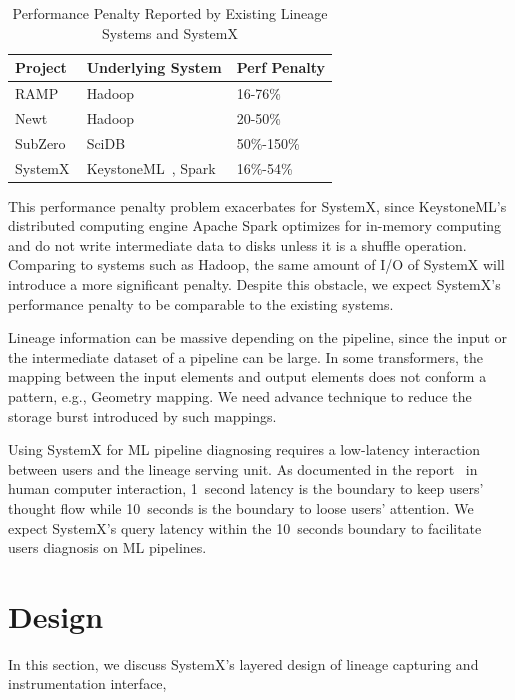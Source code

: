 \documentclass{sig-alternate}
\begin{document}
\begin{table}[ht]
\begin{center}
    \caption{Performance Penalty Reported by Existing Lineage Systems and SystemX}
    \begin{scriptsize}
    \begin{tabular}{ | p{1.5cm} | p{3.5cm} | p{2cm} |}
    \hline
    Project & Underlying System & Perf Penalty  \\ \hline \hline
    RAMP~\cite{ikeda11} & Hadoop~\cite{HADOOP} & 16-76\% \\ \hline
    Newt~\cite{logothetis13} & Hadoop~\cite{HADOOP} & 20-50\% \\ \hline
    SubZero~\cite{wu13} & SciDB~\cite{brown10} & 50\%-150\% \\ \hline
    SystemX & KeystoneML~\cite{sparks15}, Spark~\cite{zaharia12} & 16\%-54\% \\ \hline
    \end{tabular}
    \end{scriptsize}
    \label{tb:overhead}
\end{center}   
\end{table}

This performance penalty problem exacerbates for SystemX, since KeystoneML's distributed computing engine Apache Spark 
optimizes for in-memory computing and do not write intermediate data to disks unless it is a shuffle operation. 
Comparing to systems such as Hadoop, the same amount of I/O of SystemX will introduce a more significant penalty.
Despite this obstacle, we expect SystemX's performance penalty to be comparable to the existing systems.

Lineage information can be massive depending on the pipeline, since the input or the intermediate dataset of a pipeline can be large.
In some transformers, the mapping between the input elements and output elements does not conform a pattern, e.g., Geometry mapping.
We need advance technique to reduce the storage burst introduced by such mappings.

Using SystemX for ML pipeline diagnosing requires a low-latency interaction between users and the lineage serving unit.
As documented in the report~\cite{nielsen2009} in human computer interaction, 1~second latency is the boundary to keep users' thought flow while 10~seconds
is the boundary to loose users' attention.
We expect SystemX's query latency within the 10~seconds boundary to facilitate users diagnosis on ML pipelines.

\section{Design}
\label{sec:Design}
In this section, we discuss SystemX's layered design of lineage capturing and instrumentation interface, 
\end{document}
